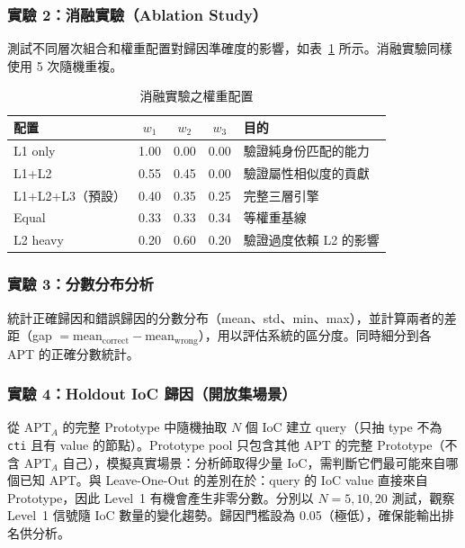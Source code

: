 \begin{ZhChapter}
\subsubsection{實驗 2：消融實驗（Ablation Study）}
\label{subsec:exp2}

測試不同層次組合和權重配置對歸因準確度的影響，如表~\ref{tab:ablation} 所示。消融實驗同樣使用 5 次隨機重複。

\begin{table}[htbp]
    \centering
    \caption{消融實驗之權重配置}
    \label{tab:ablation}
    \renewcommand\arraystretch{1.2}
    \begin{tabular}{l c c c l}
        \hline
        \textbf{配置} & $w_1$ & $w_2$ & $w_3$ & \textbf{目的} \\
        \hline
        L1 only       & 1.00 & 0.00 & 0.00 & 驗證純身份匹配的能力 \\
        L1+L2         & 0.55 & 0.45 & 0.00 & 驗證屬性相似度的貢獻 \\
        L1+L2+L3（預設）& 0.40 & 0.35 & 0.25 & 完整三層引擎 \\
        Equal         & 0.33 & 0.33 & 0.34 & 等權重基線 \\
        L2 heavy      & 0.20 & 0.60 & 0.20 & 驗證過度依賴 L2 的影響 \\
        \hline
    \end{tabular}
\end{table}

\subsubsection{實驗 3：分數分布分析}
\label{subsec:exp3}

統計正確歸因和錯誤歸因的分數分布（mean、std、min、max），並計算兩者的差距（gap $= \text{mean}_{\text{correct}} - \text{mean}_{\text{wrong}}$），用以評估系統的區分度。同時細分到各 APT 的正確分數統計。

\subsubsection{實驗 4：Holdout IoC 歸因（開放集場景）}
\label{subsec:exp4}

從 APT$_A$ 的完整 Prototype 中隨機抽取 $N$ 個 IoC 建立 query（只抽 type 不為 \texttt{cti} 且有 value 的節點）。Prototype pool 只包含其他 APT 的完整 Prototype（不含 APT$_A$ 自己），模擬真實場景：分析師取得少量 IoC，需判斷它們最可能來自哪個已知 APT。與 Leave-One-Out 的差別在於：query 的 IoC value 直接來自 Prototype，因此 Level~1 有機會產生非零分數。分別以 $N = 5, 10, 20$ 測試，觀察 Level~1 信號隨 IoC 數量的變化趨勢。歸因門檻設為 0.05（極低），確保能輸出排名供分析。


\end{ZhChapter}
